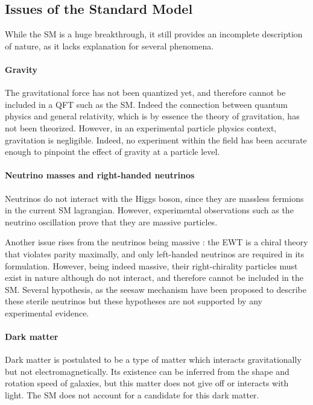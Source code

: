 \subsection{Issues of the Standard Model}
\label{sec:SM_limits}

While the SM is a huge breakthrough, it still provides an incomplete description of nature, as it lacks explanation for several phenomena. 

\paragraph{Gravity} The gravitational force has not been quantized yet, and therefore cannot be included in a QFT such as the SM. Indeed the connection between quantum physics and general relativity, which is by essence the theory of gravitation, has not been theorized. However, in an experimental particle physics context, gravitation is negligible. Indeed, no experiment within the field has been accurate enough to pinpoint the effect of gravity at a particle level.

\paragraph{Neutrino masses and right-handed neutrinos} Neutrinos do not interact with the Higgs boson, since they are massless fermions in the current SM lagrangian. However, experimental observations such as the neutrino oscillation \cite{PhysRevLett.81.1562,PhysRevLett.89.011301} prove that they are massive particles.

Another issue rises from the neutrinos being massive : the EWT is a chiral theory that violates parity maximally, and only left-handed neutrinos are required in its formulation. However, being indeed massive, their right-chirality particles must exist in nature although do not interact, and therefore cannot be included in the SM. Several hypothesis, as the seesaw mechanism \cite{PhysRevD.22.2227,PhysRevLett.60.1813,PhysRevD.23.165,PhysRevLett.44.912,GellMann:1980vs,MINKOWSKI1977421} have been proposed to describe these sterile neutrinos but these hypotheses are not supported by any experimental evidence.

\paragraph{Dark matter} Dark matter is postulated to be a type of matter which interacts gravitationally but not electromagnetically. Its existence can be inferred from the shape and rotation speed of galaxies, but this matter does not give off or interacts with light. The SM does not account for a candidate for this dark matter.

